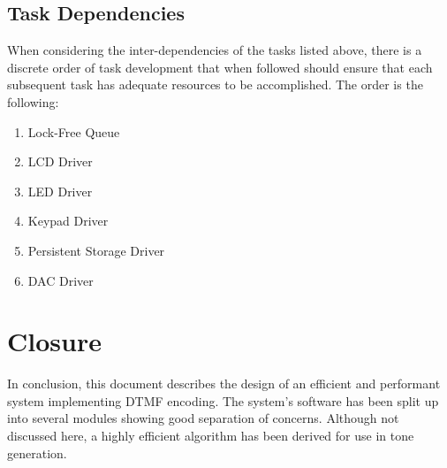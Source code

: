 \documentclass[11pt,a4paper,twocolumn]{scrartcl}
\begin{document}
\subsection{Task Dependencies}
When considering the inter-dependencies of the tasks listed above, there is a discrete order of task development that when followed should ensure that each subsequent task has adequate resources to be accomplished. The order is the following:
\begin{enumerate}
    \item Lock-Free Queue
    \item LCD Driver
   \item LED Driver
   \item Keypad Driver
   \item Persistent Storage Driver
   \item DAC Driver
\end{enumerate}

\section{Closure}

In conclusion, this document describes the design of an efficient and performant system implementing DTMF encoding. The system's software has been split up
into several modules showing good separation of concerns. Although not discussed here, a highly efficient algorithm has been derived for use in tone generation.



\end{document}
